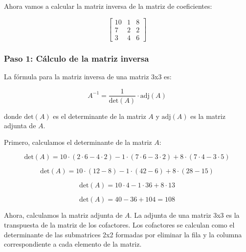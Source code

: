 \documentclass[]{article}
\begin{document}
	Ahora vamos a calcular la matriz inversa de la matriz de coeficientes:
	
	\[
	\begin{bmatrix}
		10 & 1 & 8 \\
		7 & 2 & 2 \\
		3 & 4 & 6
	\end{bmatrix}
	\]
	
	\subsubsection*{Paso 1: Cálculo de la matriz inversa}
	La fórmula para la matriz inversa de una matriz 3x3 es:
	
	\[
	A^{-1} = \frac{1}{\text{det}(A)} \cdot \text{adj}(A)
	\]
	
	donde \(\text{det}(A)\) es el determinante de la matriz \(A\) y \(\text{adj}(A)\) es la matriz adjunta de \(A\).
	
	Primero, calculamos el determinante de la matriz \(A\):
	
	\[
	\text{det}(A) = 10 \cdot (2 \cdot 6 - 4 \cdot 2) - 1 \cdot (7 \cdot 6 - 3 \cdot 2) + 8 \cdot (7 \cdot 4 - 3 \cdot 5)
	\]
	
	\[
	\text{det}(A) = 10 \cdot (12 - 8) - 1 \cdot (42 - 6) + 8 \cdot (28 - 15)
	\]
	
	\[
	\text{det}(A) = 10 \cdot 4 - 1 \cdot 36 + 8 \cdot 13
	\]
	
	\[
	\text{det}(A) = 40 - 36 + 104 = 108
	\]
	
	
	Ahora, calculamos la matriz adjunta de \(A\). La adjunta de una matriz 3x3 es la transpuesta de la matriz de los cofactores. Los cofactores se calculan como el determinante de las submatrices 2x2 formadas por eliminar la fila y la columna correspondiente a cada elemento de la matriz.
     		
\end{document}
